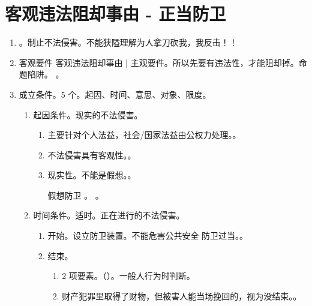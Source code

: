 \section{客观违法阻却事由 - 正当防卫}
\begin{enumerate}
  \item {}。制止不法侵害。不能狭隘理解为人拿刀砍我，我反击！！
  \item 客观要件 \yjt 客观违法阻却事由 \yjt | 主观要件。所以先要有违法性，才能阻却掉。命题陷阱。
        。
  \item 成立条件。5 个。起因、时间、意思、对象、限度。
        \begin{enumerate}
          \item 起因条件。现实的不法侵害。
                \begin{enumerate}
                  \item 主要针对个人法益，社会/国家法益由公权力处理。。
                  \item 不法侵害具有客观性。。
                  \item 现实性。不能是假想。。
                        \begin{kk}{假想防卫}
                          。
                          。
                        \end{kk}
                \end{enumerate}
          \item 时间条件。适时。正在进行的不法侵害。
                \begin{enumerate}
                  \item 开始。设立防卫装置。不能危害公共安全 \yjt 防卫过当。。
                  \item 结束。
                        \begin{enumerate}
                          \item 2 项要素。（）。一般人行为时判断。
                          \item 财产犯罪里取得了财物，但被害人能当场挽回的，视为没结束。。
                        \end{enumerate}

\end{enumerate}
\end{enumerate}
\end{enumerate}
